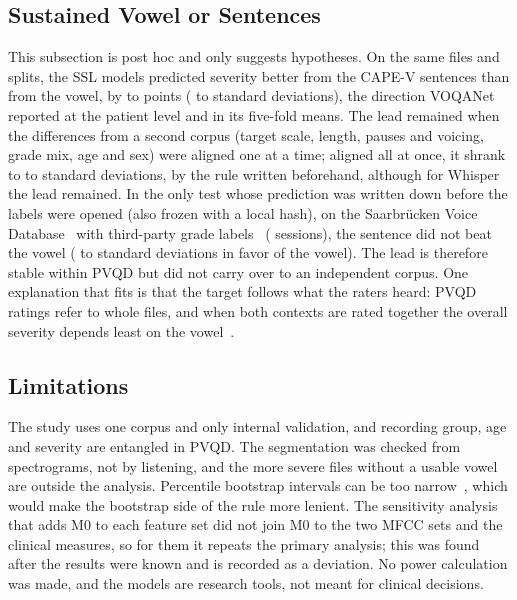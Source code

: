 \documentclass[journal]{IEEEtran}
\begin{document}
\subsection{Sustained Vowel or Sentences}\label{sec:materials}
This subsection is post hoc and only suggests hypotheses. On the same files and splits, the SSL models predicted severity better from the CAPE-V sentences than from the vowel, by \ptwocAfiveSentencesDelta{} to \ptwocAsixSentencesDelta{} points (\ptwocAfiveSentencesSd{} to \ptwocAsixSentencesSd{} standard deviations), the direction VOQANet reported at the patient level and in its five-fold means. The lead remained when the differences from a second corpus (target scale, length, pauses and voicing, grade mix, age and sex) were aligned one at a time; aligned all at once, it shrank to \rfourtwooneAfiveD{} to \rfourtwooneAsixD{} standard deviations, \rfourtwooneReading{} by the rule written beforehand, although for Whisper the lead remained. In the only test whose prediction was written down before the labels were opened (also frozen with a local hash), on the Saarbr\"{u}cken Voice Database~\cite{putzer2008svd} with third-party grade labels~\cite{ariaslondono2019grb} (\rthreeSessions{} sessions), the sentence did not beat the vowel (\rthreeAsixD{} to \rthreeAfiveD{} standard deviations in favor of the vowel). The lead is therefore stable within PVQD but did not carry over to an independent corpus. One explanation that fits is that the target follows what the raters heard: PVQD ratings refer to whole files, and when both contexts are rated together the overall severity depends least on the vowel~\cite{maryn2012sustained}.

\subsection{Limitations}\label{sec:limitations}
The study uses one corpus and only internal validation, and recording group, age and severity are entangled in PVQD. The segmentation was checked from spectrograms, not by listening, and the \filesNoA{} more severe files without a usable vowel are outside the analysis. Percentile bootstrap intervals can be too narrow~\cite{davison1997bootstrap}, which would make the bootstrap side of the rule more lenient. The sensitivity analysis that adds M0 to each feature set did not join M0 to the two MFCC sets and the clinical measures, so for them it repeats the primary analysis; this was found after the results were known and is recorded as a deviation. No power calculation was made, and the models are research tools, not meant for clinical decisions.
\end{document}
